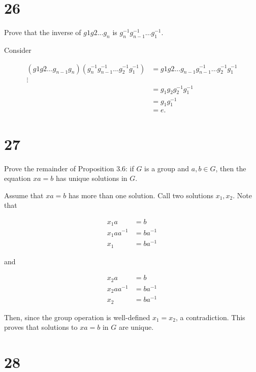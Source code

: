 \documentclass[a4paper]{article}
\begin{document}
\section*{26}

Prove that the inverse of $g1 g2 ... g_n$ is $g_n^{-1} g_{n-1}^{-1} ... g_1^{-1}$.

\vspace{\baselineskip}

Consider

\begin{align*}
(g1 g2 ... g_{n-1} g_n) (g_n^{-1} g_{n-1}^{-1} ... g_2^{-1} g_1^{-1}) &= g1 g2 ... g_{n-1} g_{n-1}^{-1} ... g_2^{-1} g_1^{-1} \\
\vdots \\
&= g_1 g_2 g_2^{-1} g_1^{-1} \\
&= g_1 g_1^{-1} \\
&= e.
\end{align*}


\section*{27}

Prove the remainder of Proposition 3.6: if $G$ is a group and $a,b \in G$, then the equation $xa = b$ has unique solutions in $G$.

\vspace{\baselineskip}

Assume that $xa = b$ has more than one solution. Call two solutions $x_1, x_2$. Note that 

\begin{align*}
x_1 a &= b \\
x_1 a a^{-1} &= b a^{-1} \\
x_1 &= b a^{-1}
\end{align*}

and 

\begin{align*}
x_2 a &= b \\
x_2 a a^{-1} &= b a^{-1} \\
x_2 &= b a^{-1}
\end{align*}

Then, since the group operation is well-defined $x_1 = x_2$, a contradiction. This proves that solutions to $xa = b$ in $G$ are unique.


\section*{28}
\end{document}
